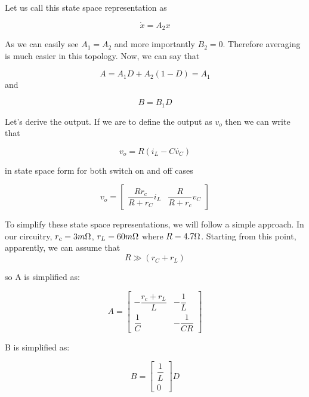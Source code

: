 Let us call this state space representation as

$$ \Dot{x} = A_2 x$$

As we can easily see $A_1 = A_2$ and more importantly $B_2 = 0$. Therefore averaging is much easier in this topology. Now, we can say that

\begin{equation}
    A = A_1D + A_2(1-D) = A_1
\end{equation}
and

\begin{equation}
    B = B_1D
\end{equation}

Let's derive the output. If we are to define the output as $v_o$ then we can write that

\begin{equation}
    v_o = R(i_L - C\Dot{v_C})
\end{equation}

in state space form for both switch on and off cases

\begin{equation}
    v_o = \begin{bmatrix}
    \dfrac{R r_c}{R+r_C}i_L & \dfrac{R}{R+r_c}v_C
    \end{bmatrix}
\end{equation}

To simplify these state space representations, we will follow a simple approach. In our circuitry, $r_c = 3 m\ohm$, $r_L = 60 m\ohm$ where $R = 4.7 \ohm$. Starting from this point, apparently, we can assume that
\begin{equation}
R \gg (r_C + r_L)
\end{equation}

so A is simplified as:

\begin{equation}
    A = \begin{bmatrix}
 -\dfrac{r_c + r_L}{L} & -\dfrac{1}{L} \\
 \dfrac{1}{C} & -\dfrac{1}{CR} 
\end{bmatrix}
\end{equation}

B is simplified as:

\begin{equation}
    B = \begin{bmatrix} 
 \dfrac{1}{L} \\ 0 
\end{bmatrix}
D
\end{equation}

